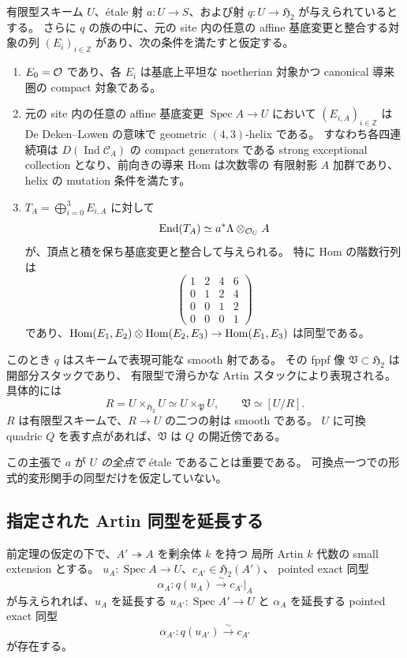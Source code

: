 \begin{theorem}
\label{thm:atlas-from-effective-foundation}
有限型スキーム $U$、\'etale 射 $a:U\to S$、および射
$q:U\to\mathfrak H_2$ が与えられているとする。
さらに $q$ の族の中に、元の site 内の任意の affine 基底変更と整合する対象の列
$(E_i)_{i\in\mathbb Z}$ があり、次の条件を満たすと仮定する。
\begin{enumerate}
 \item $E_0=\mathcal O$ であり、各 $E_i$ は基底上平坦な noetherian 対象かつ
 canonical 導来圏の compact 対象である。
 \item 元の site 内の任意の affine 基底変更 $\operatorname{Spec} A\to U$ において
 $(E_{i,A})_{i\in\mathbb Z}$ は De Deken--Lowen の意味で geometric $(4,3)$-helix である。
 すなわち各四連続項は $D(\operatorname{Ind}\mathcal C_A)$ の compact generators である
 strong exceptional collection となり、前向きの導来 Hom は次数零の
 有限射影 $A$ 加群であり、helix の mutation 条件を満たす。
 \item $T_A=\bigoplus_{i=0}^3E_{i,A}$ に対して
 \[
  \operatorname{End}(T_A)\simeq a^*\Lambda\otimes_{\mathcal O_U}A
 \]
 が、頂点と積を保ち基底変更と整合して与えられる。
 特に Hom の階数行列は
 \[
 \begin{pmatrix}
 1&2&4&6\\0&1&2&4\\0&0&1&2\\0&0&0&1
 \end{pmatrix}
 \]
 であり、$\operatorname{Hom}(E_1,E_2)\otimes\operatorname{Hom}(E_2,E_3)\to\operatorname{Hom}(E_1,E_3)$ は同型である。
\end{enumerate}
このとき $q$ はスキームで表現可能な smooth 射である。
その fppf 像 $\mathfrak V\subset\mathfrak H_2$ は開部分スタックであり、
有限型で滑らかな Artin スタックにより表現される。
具体的には
\[
 R=U\times_{\mathfrak H_2}U
   \simeq U\times_{\mathfrak P}U,
 \qquad
 \mathfrak V\simeq[U/R].
\]
$R$ は有限型スキームで、$R\to U$ の二つの射は smooth である。
$U$ に可換 quadric $Q$ を表す点があれば、$\mathfrak V$ は $Q$ の開近傍である。
\end{theorem}

この主張で $a$ が \emph{$U$ の全点で} \'etale であることは重要である。
可換点一つでの形式的変形関手の同型だけを仮定していない。

\subsection{指定された Artin 同型を延長する}

\begin{lemma}
\label{lem:atlas-artin-lift}
前定理の仮定の下で、$A'\twoheadrightarrow A$ を剰余体 $k$ を持つ
局所 Artin $k$ 代数の small extension とする。
$u_A:\operatorname{Spec} A\to U$、$c_{A'}\in\mathfrak H_2(A')$、
pointed exact 同型
\[
 \alpha_A:q(u_A)\xrightarrow{\sim}c_{A'}|_A
\]
が与えられれば、$u_A$ を延長する $u_{A'}:\operatorname{Spec} A'\to U$ と
$\alpha_A$ を延長する pointed exact 同型
\[
 \alpha_{A'}:q(u_{A'})\xrightarrow{\sim}c_{A'}
\]
が存在する。
\end{lemma}

